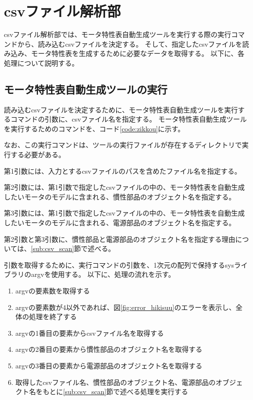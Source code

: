 \section{csvファイル解析部}\label{csv_sec}
csvファイル解析部では、モータ特性表自動生成ツールを実行する際の実行コマンドから、読み込むcsvファイルを決定する。
そして、指定したcsvファイルを読み込み、モータ特性表を生成するために必要なデータを取得する。
以下に、各処理について説明する。
\subsection{モータ特性表自動生成ツールの実行}\label{sub:zikkou_tool}
読み込むcsvファイルを決定するために、モータ特性表自動生成ツールを実行するコマンドの引数に、csvファイル名を指定する。
モータ特性表自動生成ツールを実行するためのコマンドを、コード\ref{code:zikkou}に示す。
\begin{figure}[t]
	
\end{figure}
なお、この実行コマンドは、ツールの実行ファイルが存在するディレクトリで実行する必要がある。

第1引数には、入力とするcsvファイルのパスを含めたファイル名を指定する。

第2引数には、第1引数で指定したcsvファイルの中の、モータ特性表を自動生成したいモータのモデルに含まれる、慣性部品のオブジェクト名を指定する。

第3引数には、第1引数で指定したcsvファイルの中の、モータ特性表を自動生成したいモータのモデルに含まれる、電源部品のオブジェクト名を指定する。

第2引数と第3引数に、慣性部品と電源部品のオブジェクト名を指定する理由については、\ref{sub:csv_scan}節で述べる。

引数を取得するために、実行コマンドの引数を、1次元の配列で保持するsysライブラリのargvを使用する。
以下に、処理の流れを示す。

\begin{enumerate}
    \item argvの要素数を取得する
    \item argvの要素数が4以外であれば、図\ref{fig:error_hikisuu}のエラーを表示し、全体の処理を終了する
    \item argvの1番目の要素からcsvファイル名を取得する
    \item argvの2番目の要素から慣性部品のオブジェクト名を取得する
    \item argvの3番目の要素から電源部品のオブジェクト名を取得する
    \item 取得したcsvファイル名、慣性部品のオブジェクト名、電源部品のオブジェクト名をもとに\ref{sub:csv_scan}節で述べる処理を実行する
\end{enumerate}

